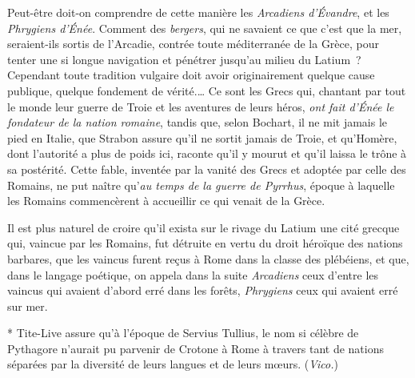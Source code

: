 \documentclass[french,twoside]{book} %
\begin{document}
{Peut-être doit-on comprendre de cette manière les {\itshape Arcadiens d’Évandre}, et les {\itshape Phrygiens d’Énée}. Comment des {\itshape bergers}, qui ne savaient ce que c’est que la mer, seraient-ils sortis de l’Arcadie, contrée toute méditerranée de la Grèce, pour tenter une si longue navigation et pénétrer jusqu’au milieu du Latium ? Cependant toute tradition vulgaire doit avoir originairement quelque cause publique, quelque fondement de vérité.… Ce sont les Grecs qui, chantant par tout le monde leur guerre de Troie et les aventures de leurs héros, {\itshape ont fait d’Énée le fondateur de la nation romaine}, tandis que, selon Bochart, il ne mit jamais le pied en Italie, que Strabon assure qu’il ne sortit jamais de Troie, et qu’Homère, dont l’autorité a plus de poids ici, raconte qu’il y mourut et qu’il laissa le trône à sa postérité. Cette fable, inventée par la vanité des Grecs et adoptée par celle des Romains, ne put naître qu’{\itshape au temps de la guerre de Pyrrhus}, époque à laquelle les Romains commencèrent à accueillir ce qui venait de la Grèce.\par
Il est plus naturel de croire qu’il exista sur le rivage du Latium une cité grecque qui, vaincue par les Romains, fut détruite en vertu du droit héroïque des nations barbares, que les vaincus furent reçus à Rome dans la classe des plébéiens, et que, dans le langage poétique, on appela dans la suite {\itshape Arcadiens} ceux d’entre les vaincus qui avaient d’abord erré dans les forêts, {\itshape Phrygiens} ceux qui avaient erré sur mer.\par
* Tite-Live assure qu’à l’époque de Servius Tullius, le nom si célèbre de Pythagore n’aurait pu parvenir de Crotone à Rome à travers tant de nations séparées par la diversité de leurs langues et de leurs mœurs. ({\itshape Vico.})
}
\end{document}
